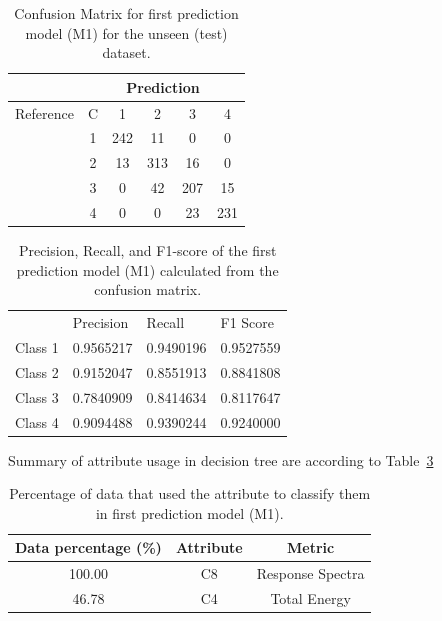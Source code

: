 \begin{table}
\centering
\caption{Confusion Matrix for first prediction model (M1) for the unseen (test) dataset.}
\begin{tabular}{cccccc}
\hline
                           & \multicolumn{5}{c}{Prediction} \\ \hline
{Reference}         & C    & 1      & 2      & 3      & 4       \\
                            & 1     & 242  & 11    & 0      & 0    \\
                            & 2     & 13    & 313  & 16    & 0    \\
                            & 3     & 0      & 42    & 207  & 15   \\
                            & 4     & 0      & 0      & 23    & 231  \\ \hline
\end{tabular}
\label{tab:confusionmat_test_1}
\end{table}


\begin{table}
\centering
\caption{Precision, Recall, and F1-score of the first prediction model (M1) calculated from the confusion matrix.}
\begin{tabular}{llll}
\hline
        & Precision & Recall  & F1 Score \\ \cline{2-4} 
Class 1 & 0.9565217 & 0.9490196 & 0.9527559 \\
Class 2 & 0.9152047 & 0.8551913 & 0.8841808 \\
Class 3 & 0.7840909 & 0.8414634 & 0.8117647 \\
Class 4 & 0.9094488 & 0.9390244 & 0.9240000 \\ \hline
\end{tabular}
\label{tab:prec_recall_test_1}
\end{table}

Summary of attribute usage in decision tree are according to Table~\ref{tab:attribute_usage_1}

\begin{table}
\centering
\caption{Percentage of data that used the attribute to classify them in first prediction model (M1).}
\begin{tabular}{ccc}
\hline
Data percentage (\%) & Attribute & Metric                \\ \hline
100.00               & C8        & Response Spectra      \\
46.78                 & C4        & Total Energy         \\ \hline
\end{tabular}
\label{tab:attribute_usage_1}
\end{table}


